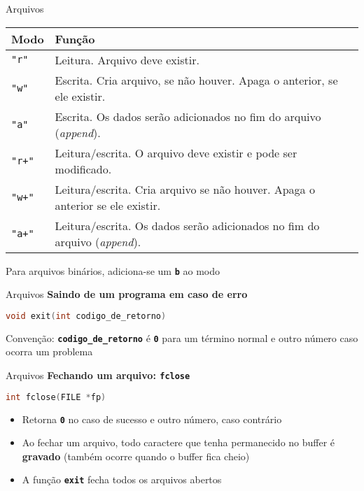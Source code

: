 \documentclass[10pt]{beamer}
\begin{document}
\begin{frame}{Arquivos}
  \footnotesize
  \begin{center}
    \begin{tabular}{@{}ll@{}}
      \toprule
      \textbf{Modo} & \textbf{Função} \\
      \midrule
      \texttt{"r"} & Leitura. Arquivo deve existir. \\
      \texttt{"w"} & Escrita. Cria arquivo, se não houver. Apaga o anterior, se ele existir. \\
      \texttt{"a"} & Escrita. Os dados serão adicionados no fim do arquivo (\textit{append}). \\
      \texttt{"r+"} & Leitura/escrita. O arquivo deve existir e pode ser modificado. \\
      \texttt{"w+"} & Leitura/escrita. Cria arquivo se não houver. Apaga o anterior se ele existir. \\
      \texttt{"a+"} & Leitura/escrita. Os dados serão adicionados no fim do arquivo (\textit{append}). \\
      \bottomrule
    \end{tabular}
  \end{center}
  \vfill
  \large
  Para arquivos binários, adiciona-se um \textbf{\texttt{b}} ao modo
\end{frame}

\begin{frame}[fragile]{Arquivos}
  \huge
  \textbf{Saindo de um programa em caso de erro}
  \vfill
  \Large
  \begin{lstlisting}[language=C]
void exit(int codigo_de_retorno)
  \end{lstlisting}
  \vfill
  \large
  Convenção: \texttt{\textbf{codigo\_de\_retorno}} é \texttt{\textbf{0}} para um término normal e outro número caso ocorra um problema
\end{frame}

\begin{frame}[fragile]{Arquivos}
  \huge
  \textbf{Fechando um arquivo: \texttt{fclose}}
  \vfill
  \large
  \begin{lstlisting}[language=C]
int fclose(FILE *fp)
  \end{lstlisting}
  \vfill
  \setlength{\leftmargini}{0pt}
  \begin{itemize}
      \item [] Retorna \texttt{\textbf{0}} no caso de sucesso e outro número, caso contrário
      \item [] Ao fechar um arquivo, todo caractere que tenha permanecido no buffer é \textbf{gravado} (também ocorre quando o buffer fica cheio)
      \item [] A função \texttt{\textbf{exit}} fecha todos os arquivos abertos
  \end{itemize}
\end{frame}
\end{document}

